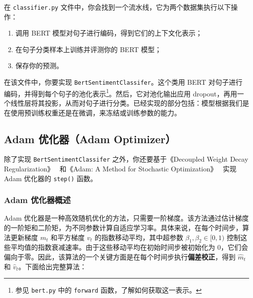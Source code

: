 \documentclass[11pt]{article}
\begin{document}
在 \texttt{classifier.py} 文件中，你会找到一个流水线，它为两个数据集执行以下操作：
\begin{enumerate}
  \item 调用 BERT 模型对句子进行编码，得到它们的上下文化表示；
  \item 在句子分类样本上训练并评测你的 BERT 模型；
  \item 保存你的预测。
\end{enumerate}

在该文件中，你要实现 \texttt{BertSentimentClassifer}。这个类用 BERT 对句子进行编码，并得到每个句子的池化表示\footnote{参见 \texttt{bert.py} 中的 \texttt{forward} 函数，了解如何获取这一表示。}。然后，它对池化输出应用 dropout，再用一个线性层将其投影，从而对句子进行分类。已经实现的部分包括：模型根据我们是在使用预训练权重还是在微调，来冻结或训练参数的能力。

\subsection{Adam 优化器（Adam Optimizer）}

除了实现 \texttt{BertSentimentClassifer} 之外，你还要基于《Decoupled Weight Decay Regularization》~\cite{loshchilov2017decoupled} 和《Adam: A Method for Stochastic Optimization》~\cite{kingma2014adam} 实现 Adam 优化器的 \texttt{step()} 函数。

\subsubsection{Adam 优化器概述}

Adam 优化器是一种高效随机优化的方法，只需要一阶梯度。该方法通过估计梯度的一阶矩和二阶矩，为不同参数计算自适应学习率。具体来说，在每个时间步，算法更新梯度 $m_t$ 和平方梯度 $v_t$ 的指数移动平均，其中超参数 $\beta_1, \beta_2 \in [0, 1)$ 控制这些平均值的指数衰减速率。由于这些移动平均在初始时间步被初始化为 0，它们会偏向于零。因此，该算法的一个关键方面是在每个时间步执行\textbf{偏差校正}，得到 $\hat{m}_t$ 和 $\hat{v}_t$。下面给出完整算法：
\end{document}
